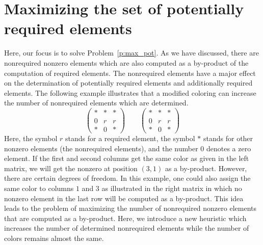 \documentclass[12pt, twoside,a4paper,toc=bibliography]{scrbook}
\begin{document}
\section{Maximizing the set of potentially required elements}
\label{s.max.pot.req}
Here, our focus is to solve Problem~\ref{p:max_pot}.
As we have discussed, there are nonrequired nonzero elements
which are also computed as a by-product of the computation of required elements.
The nonrequired elements have a major effect on
the determination of potentially required elements
and additionally required elements.
The following example illustrates that
a modified coloring can increase the number of nonrequired elements
which are determined.
\begin{equation}
\left(\begin{array}{rrb}
* & * & *\\
0 & r & r \\
* & 0 & *
\end{array}\right)
\qquad
\left(\begin{array}{rbr}
* & * & *\\
0 & r & r \\
* & 0 & *
\end{array}\right)
\label{twocolorings}
\end{equation}
Here, the symbol $r$ stands for a required element,
the symbol \textit{$*$} stands for other nonzero elements (the nonrequired elements),
and the number $0$ denotes a zero element.
If the first and second columns get the same color as given in the left matrix,
we will get the nonzero at position $(3,1)$ as a by-product.
However, there are certain degrees of freedom. In
this example, one could also assign the same color to columns $1$ and
$3$ as illustrated in the right matrix
in which no nonzero element in the last row will be computed
as a by-product. This idea leads to the problem of maximizing
the number of nonrequired nonzero elements that are computed as a by-product.
Here, we introduce a new heuristic which increases the number of determined nonrequired elements 
while the number of colors remains almost the same.
\end{document}
